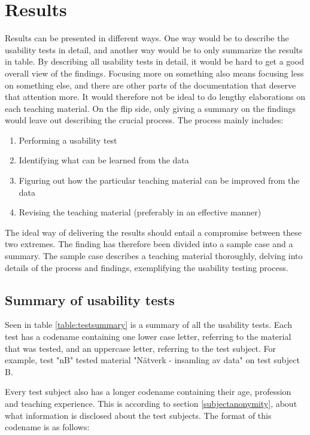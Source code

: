 \chapter{Results}
Results can be presented in different ways. One way would be to describe the usability tests in detail, and another way would be to only summarize the results in table. 
By describing all usability tests in detail, it would be hard to get a good overall view of the findings. Focusing more on something also means focusing less on something 
else, and there are other parts of the documentation that deserve that attention more. It would therefore not be ideal to do lengthy elaborations on each teaching material.
On the flip side, only giving a summary on the findings would leave out describing the crucial process. The process mainly includes:
\begin{enumerate}
	\item Performing a usability test
	\item Identifying what can be learned from the data
	\item Figuring out how the particular teaching material can be improved from the data
	\item Revising the teaching material (preferably in an effective manner)
\end{enumerate}
The ideal way of delivering the results should entail a compromise between these two extremes. The finding has therefore been divided into a sample case and a summary.
The sample case describes a teaching material thoroughly, delving into details of the process and findings, exemplifying the usability testing process. 

\section{Summary of usability tests}

Seen in table \ref{table:testsummary} is a summary of all the usability tests. Each test has a codename containing one lower case letter, referring to the material that was tested, and an uppercase letter, referring to the test subject. For example, test "nB" tested material "Nätverk - insamling av data" on test subject B. 

Every test subject also has a longer codename containing their age, profession and teaching experience. This is according to section \ref{subjectanonymity}, about what information is disclosed about the test subjects. The format of this codename is as follows:

